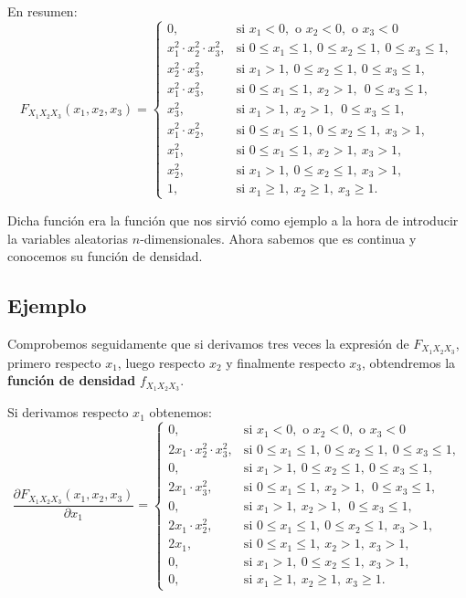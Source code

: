 \documentclass[]{book}
\begin{document}
En resumen:
\[
F_{X_1X_2X_3}(x_1,x_2,x_3)=\begin{cases}
0, & \mbox{si }x_1<0,\mbox{ o }x_2<0,\mbox{ o }x_3 <0\\
x_1^2\cdot x_2^2\cdot x_3^2, & \mbox{si }0\leq x_1\leq 1,\ 0\leq x_2\leq 1,\ 0\leq x_3\leq 1, \\
 x_2^2\cdot x_3^2, & \mbox{si }x_1> 1,\ 0\leq x_2\leq  1,\ 0\leq x_3\leq  1, \\
 x_1^2\cdot x_3^2, & \mbox{si }0\leq x_1\leq  1,\ x_2> 1,\ \ 0\leq x_3\leq  1, \\
 x_3^2, & \mbox{si }x_1> 1,\ x_2> 1,\ \ 0\leq x_3\leq  1, \\
 x_1^2\cdot x_2^2, & \mbox{si }0\leq x_1\leq  1,\ 0\leq x_2\leq  1,\ x_3> 1,\\
 x_1^2, & \mbox{si }0\leq x_1\leq  1,\ x_2 >  1,\ x_3> 1,\\
 x_2^2, & \mbox{si }x_1>1,\ 0\leq x_2\leq  1,\ x_3> 1,\\
1, & \mbox{si }x_1\geq 1,\ x_2\geq 1,\ x_3\geq 1.
\end{cases}
\]

Dicha función era la función que nos sirvió como ejemplo a la hora de introducir la variables aleatorias \(n\)-dimensionales. Ahora sabemos que es continua y conocemos su función de densidad.

\hypertarget{ejemplo-114}{%
\subsection{Ejemplo}\label{ejemplo-114}}

Comprobemos seguidamente que si derivamos tres veces la expresión de \(F_{X_1X_2X_3}\), primero respecto \(x_1\), luego respecto \(x_2\) y finalmente respecto \(x_3\), obtendremos la \textbf{función de densidad} \(f_{X_1X_2X_3}\).

Si derivamos respecto \(x_1\) obtenemos:
\[
\frac{\partial F_{X_1X_2X_3}(x_1,x_2,x_3)}{\partial x_1}=\begin{cases}
0, & \mbox{si }x_1<0,\mbox{ o }x_2<0,\mbox{ o }x_3 <0\\
2 x_1\cdot x_2^2\cdot x_3^2, & \mbox{si }0\leq x_1\leq 1,\ 0\leq x_2\leq 1,\ 0\leq x_3\leq 1, \\
 0, & \mbox{si }x_1> 1,\ 0\leq x_2\leq  1,\ 0\leq x_3\leq  1, \\
 2 x_1 \cdot x_3^2, & \mbox{si }0\leq x_1\leq  1,\ x_2> 1,\ \ 0\leq x_3\leq  1, \\
 0, & \mbox{si }x_1> 1,\ x_2> 1,\ \ 0\leq x_3\leq  1, \\
 2 x_1\cdot x_2^2, & \mbox{si }0\leq x_1\leq  1,\ 0\leq x_2\leq  1,\ x_3> 1,\\
 2 x_1, & \mbox{si }0\leq x_1\leq  1,\ x_2 >  1,\ x_3> 1,\\
 0, & \mbox{si }x_1>1,\ 0\leq x_2\leq  1,\ x_3> 1,\\
0, & \mbox{si }x_1\geq 1,\ x_2\geq 1,\ x_3\geq 1.
\end{cases}
\]
\end{document}
